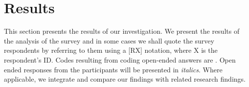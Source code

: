 




\section{Results}
\label{sec:results}

This section presents the results of our investigation.
We present the results of the analysis of the survey and in some cases we shall quote the survey respondents by referring to them using a [RX] notation, where X is the respondent’s ID.
Codes resulting from coding open-ended answers are .
Open ended responses from the participants will be presented in \emph{italics}.
Where applicable, we integrate and compare our findings with related research findings.

\begin{figure}[ht]
\centering
\vspace{-.3cm}
    \hfill
    \hfill
    \hfill
    \caption{\rqTwo}
     \label{fig:decision_motivations}
     \vspace{-.3cm}
\end{figure}



